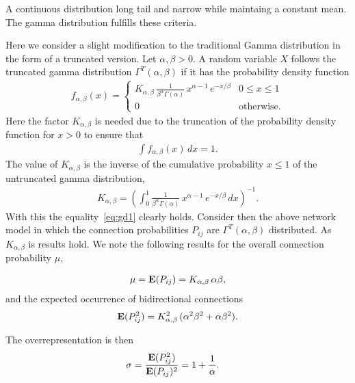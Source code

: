 
A continuous distribution  long tail and narrow while maintaing a constant mean. The gamma distribution fulfills these criteria.

Here we consider a slight modification to the traditional Gamma distribution in the form of a truncated version. Let $\alpha, \beta > 0$. A random variable $X$ follows the truncated gamma distribution $\Gamma^T(\alpha, \beta)$ if it has the probability density function 
%
\begin{align}
  f_{\alpha,\beta}(x) = \begin{cases} K_{\alpha, \beta}\,
\frac{1}{\beta^{\alpha}\Gamma(\alpha)}\, x^{\alpha-1}\,e^{-x/\beta} & 0 \leq x \leq 1 \\
0 & \text{otherwise}.
\end{cases}
\end{align}
%
Here the factor $K_{\alpha,\beta}$ is needed due to the truncation of the probability density function for $x>0$ to ensure that
\begin{align}
  \int f_{\alpha,\beta}(x) \,dx = 1. \label{eq:gd1}
\end{align}
The value of $K_{\alpha,\beta}$ is the inverse of the cumulative probability $x \leq 1$ of the untruncated gamma distribution,
\begin{align}
  K_{\alpha,\beta} = \left(\int_0^{1} \frac{1}{\beta^{\alpha}\Gamma(\alpha)}\, x^{\alpha-1}\,e^{-x/\beta} \, dx \right)^{-1}.
\end{align}
With this the equality~\eqref{eq:gd1} clearly holds. Consider then the above network model in which the connection probabilities $P_{ij}$ are $\Gamma^T(\alpha, \beta)$ distributed. As $K_{\alpha,\beta}$ is results hold. We note the following results for the overall connection probability $\mu$,

\begin{align}
 \mu = \operatorname{\mathbf{E}}(P_{ij}) = K_{\alpha,\beta} \, \alpha \beta,
\end{align}
and the expected occurrence of bidirectional connections
\begin{align}
  \operatorname{\mathbf{E}}(P_{ij}^2) = K_{\alpha,\beta}^2 \, (\alpha^2 \beta^2 + \alpha \beta^2).
\end{align}

The overrepresentation is then
\begin{align}
  \sigma & = \frac{\E(P_{ij}^2)}{\E(P_{ij})^2} =%
  1 + \frac{1}{\alpha}.
\end{align}


